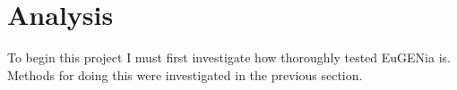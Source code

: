 \chapter{Analysis}



To begin this project I must first investigate how thoroughly tested EuGENia is. Methods for doing this were investigated in the previous section.